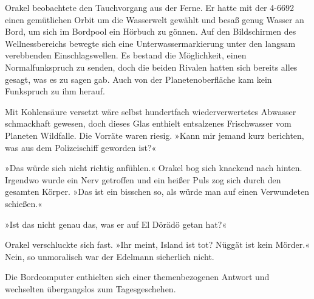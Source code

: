 Orakel beobachtete den Tauchvorgang aus der Ferne. Er hatte mit der 4-6692 einen gemütlichen Orbit um die Wasserwelt gewählt und besaß genug Wasser an Bord, um sich im Bordpool ein Hörbuch zu gönnen. Auf den Bildschirmen des Wellnessbereichs bewegte sich eine Unterwassermarkierung unter den langsam verebbenden Einschlagswellen. Es bestand die Möglichkeit, einen Normalfunkspruch zu senden, doch die beiden Rivalen hatten sich bereits alles gesagt, was es zu sagen gab. Auch von der Planetenoberfläche kam kein Funkspruch zu ihm herauf.

Mit Kohlensäure versetzt wäre selbst hundertfach wiederverwertetes Abwasser schmackhaft gewesen, doch dieses Glas enthielt entsalzenes Frischwasser vom Planeten Wildfalle. Die Vorräte waren riesig. »Kann mir jemand kurz berichten, was aus dem Polizeischiff geworden ist?«


»Das würde sich nicht richtig anfühlen.« Orakel bog sich knackend nach hinten. Irgendwo wurde ein Nerv getroffen und ein heißer Puls zog sich durch den gesamten Körper. »Das ist ein bisschen so, als würde man auf einen Verwundeten schießen.«


»Ist das nicht genau das, was er auf El Dörädö getan hat?«


Orakel verschluckte sich fast. »Ihr meint, Island ist tot? Nüggät ist kein Mörder.« Nein, so unmoralisch war der Edelmann sicherlich nicht.

Die Bordcomputer enthielten sich einer themenbezogenen Antwort und wechselten übergangslos zum Tagesgeschehen. 

